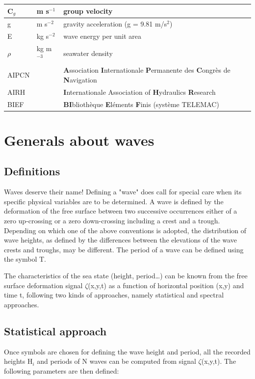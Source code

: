 \begin{tabular}{|p{0.8in}|p{0.5in}|p{3.1in}|}
  C${}_{g}$ & m s${}^{-1}$ & group velocity \\ \hline
  g & m s${}^{-2}$ & gravity acceleration (g = 9.81 m/s${}^{2}$) \\ \hline
  E & kg s${}^{-2}$ & wave energy per unit area \\ \hline
  $\rho$ & kg m${}^{-3}$ & seawater density \\ \hline
  AIPCN &  & \textbf{A}ssociation \textbf{I}nternationale \textbf{P}ermanente des \textbf{C}ongr\`{e}s de \textbf{N}avigation \\ \hline
  AIRH &  & \textbf{I}nternationale Association of \textbf{H}ydraulics \textbf{R}esearch  \\ \hline
  BIEF &  & \textbf{BI}blioth\`{e}que \textbf{E}l\'{e}ments \textbf{F}inis (syst\`{e}me TELEMAC) \\ \hline
\end{tabular}


\section{Generals about waves}\label{waves}


\subsection{Definitions}

Waves deserve their name! Defining a "wave" does call for special care when its
specific physical variables are to be determined. A wave is defined by the
deformation of the free surface between two successive occurrences either of a
zero up-crossing or a zero down-crossing including a crest and a trough.
Depending on which one of the above conventions is adopted, the distribution of
wave heights, as defined by the differences between the elevations of the wave
crests and troughs, may be different. The period of a wave can be defined using
the symbol T.

The characteristics of the sea state (height, period\ldots) can be known from
the free surface deformation signal $\zeta$(x,y,t) as a function of horizontal
position (x,y) and time t, following two kinds of approaches, namely
statistical and spectral approaches.


\subsection{Statistical approach}\label{stat_appr}

Once symbols are chosen for defining the wave height and period, all the
recorded heights H${}_{i}$ and periods of N waves can be computed from signal
$\zeta$(x,y,t). The following parameters are then defined:


